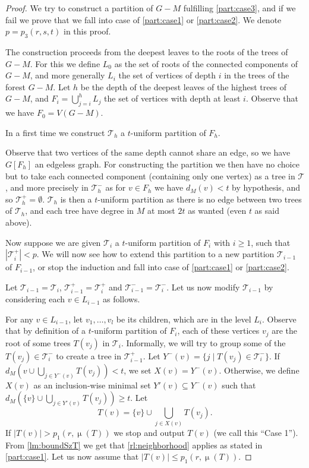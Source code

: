 \documentclass{amsart}
\newcommand{\mT}{\mathcal{T}}
\DeclareMathOperator\db{\mu}
\newcommand{\ruleref}[1]{\hyperref[#1]{\ref*{#1}}}
\begin{document}
\begin{proof}
We try to construct a partition of $G-M$ fulfilling \autoref{part:case3}, and if we fail we prove that we fall into case of \autoref{part:case1} or \autoref{part:case2}. We denote $p=p_3(r,s,t)$ in this proof.

The construction proceeds from the deepest leaves to the roots of the trees of $G-M$. For this  we define $L_0$ as the set of roots of the connected components of $G-M$, and more generally $L_i$ the set of vertices of depth $i$ in the trees of the forest $G-M$. 
Let $h$ be the depth of the deepest leaves of the highest trees of $G-M$, and $F_i=\bigcup_{j=i}^hL_j$ the set of vertices with depth at least $i$. Observe that we have $F_0=V(G-M)$.

In a first time we construct $\mT_h$ a $t$-uniform partition of $F_h$.

Observe that two vertices of the same depth cannot share an edge, so we have $G[F_h]$ an edgeless graph. For constructing the partition we then have no choice but to take each connected component (containing only one vertex) as a tree in $\mT$, and more precisely in $\mT_h^-$ as for $v\in F_h$ we have $d_M(v)<t$ by hypothesis, and so $\mT_h^+ = \emptyset$. $\mT_h$ is then a $t$-uniform partition as there is no edge between two trees of $\mT_h$, and each tree have degree in $M$ at most $2t$ as wanted (even $t$ as said above).

Now suppose we are given $\mT_i$ a $t$-uniform partition of $F_i$ with $i\geq 1$, such that $|\mT_i^+| < p$. We will now see how to extend this partition to a new partition $\mT_{i-1}$ of $F_{i-1}$, or stop the induction and fall into case of \autoref{part:case1} or \autoref{part:case2}. 

Let $\mT_{i-1} = \mT_{i}$, $\mT_{i-1}^+ = \mT_{i}^+$ and $\mT_{i-1}^- = \mT_{i}^-$. Let us now modify $\mT_{i-1}$ by considering each $v \in L_{i-1}$ as follows.

For any $v\in L_{i-1}$, let $v_1,\dots, v_l$ be its children, which are in the level $L_{i}$. Observe that by definition of a $t$-uniform partition of $F_{i}$, each of these vertices $v_j$ are the root of some trees $T(v_j)$ in $\mT_i$.
Informally, we will try to group some of the $T(v_j) \in \mT_i^-$ to create a tree in $\mT_{i-1}^+$.
Let $Y^-(v) = \{j \mid T(v_j) \in \mT_i^-\}$.
If $d_M({v}\cup \bigcup_{j \in Y^-(v)}T(v_j)) < t$, 
we set $X(v)= Y^-(v)$.
Otherwise, we define $X(v)$ as an inclusion-wise minimal set $Y'(v) \subseteq Y^-(v)$ such that $d_M\left(\{v\}\cup \bigcup_{j \in Y'(v)}T(v_j)\right) \ge t$.
Let 
$$T(v) = \{v\}\cup \bigcup_{j \in X(v)}T(v_j).$$
If $|T(v)| > p_1(r,\db(T))$ we stop and output $T(v)$ (we call this ``Case 1''). From \autoref{lm:boundSzT} we get that \ruleref{rl:neighborhood} applies as stated in \autoref{part:case1}.
Let us now assume that $|T(v)| \le p_1(r,\db(T))$.


\end{proof}
\end{document}
